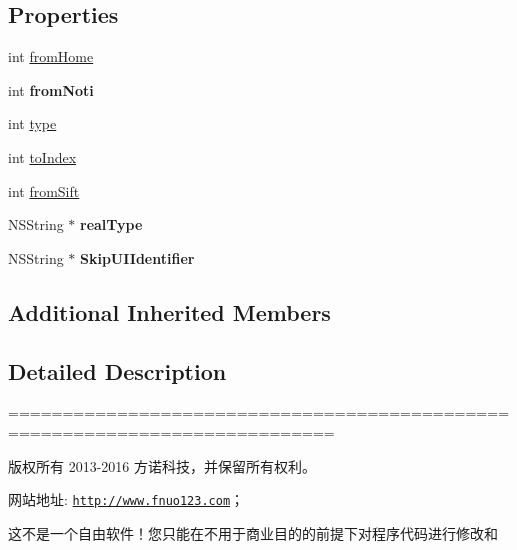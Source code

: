 \subsection*{Properties}
\begin{DoxyCompactItemize}
\item 
int \mbox{\hyperlink{interface_hight_rebates_view_controller_a7d0428e6a4ff10dda55702b017c0d64b}{from\+Home}}
\item 
\mbox{\label{interface_hight_rebates_view_controller_a578e7bea161dbb07c1ccaf96643de820}} 
int {\bfseries from\+Noti}
\item 
int \mbox{\hyperlink{interface_hight_rebates_view_controller_a161b729c6778d8f7fb719025b15d9c1f}{type}}
\item 
int \mbox{\hyperlink{interface_hight_rebates_view_controller_ae74d53f0ceed1d25b0e020187385fd76}{to\+Index}}
\item 
int \mbox{\hyperlink{interface_hight_rebates_view_controller_afed9dc98100dcd452e6da4d8725fbfe9}{from\+Sift}}
\item 
\mbox{\label{interface_hight_rebates_view_controller_a9576720dabd44d3b9dbe478fd3a71aca}} 
N\+S\+String $\ast$ {\bfseries real\+Type}
\item 
\mbox{\label{interface_hight_rebates_view_controller_ad02de5217e8d1bbeb9f01a826895c83b}} 
N\+S\+String $\ast$ {\bfseries Skip\+U\+I\+Identifier}
\end{DoxyCompactItemize}
\subsection*{Additional Inherited Members}


\subsection{Detailed Description}
============================================================================

版权所有 2013-\/2016 方诺科技，并保留所有权利。

网站地址\+: \href{http://www.fnuo123.com}{\tt http\+://www.\+fnuo123.\+com}； 



这不是一个自由软件！您只能在不用于商业目的的前提下对程序代码进行修改和

